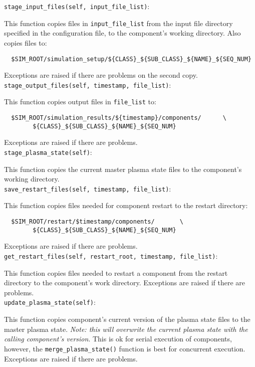 \texttt{stage\_input\_files(self, input\_file\_list)}:
\par
  This function copies files in \texttt{input\_file\_list} from the input file 
  directory specified in the configuration file, to the component's 
  working directory.  Also copies files to:
  \begin{verbatim}
  $SIM_ROOT/simulation_setup/${CLASS}_${SUB_CLASS}_${NAME}_${SEQ_NUM}
  \end{verbatim}
  Exceptions are raised if there are problems on the second copy.\\

\texttt{stage\_output\_files(self, timestamp, file\_list)}:
\par
  This function copies output files in \texttt{file\_list} to:\\
  \begin{verbatim}
  $SIM_ROOT/simulation_results/${timestamp}/components/      \
        ${CLASS}_${SUB_CLASS}_${NAME}_${SEQ_NUM}
  \end{verbatim}
  Exceptions are raised if there are problems.\\

\texttt{stage\_plasma\_state(self)}:
\par
  This function copies the current master plasma state files to the 
  component's working directory.\\

\texttt{save\_restart\_files(self, timestamp, file\_list)}:
\par
  This function copies files needed for component restart to the restart 
  directory:\\
  \begin{verbatim}
  $SIM_ROOT/restart/$timestamp/components/       \
        ${CLASS}_${SUB_CLASS}_${NAME}_${SEQ_NUM}
  \end{verbatim}
  Exceptions are raised if there are problems.\\

\texttt{get\_restart\_files(self, restart\_root, timestamp, file\_list)}:
\par
  This function copies files needed to restart a component from the 
  restart directory to the component's work directory.  Exceptions are 
  raised if there are problems.\\

\texttt{update\_plasma\_state(self)}:
\par
  This function copies component's current version of the plasma state 
  files to the master plasma state.  \emph{Note: this will overwrite the current plasma state with the calling component's version}.  This is ok for serial 
  execution of components, however, the \texttt{merge\_plasma\_state()} function is 
  best for concurrent execution.  Exceptions are raised if there are 
  problems.\\

